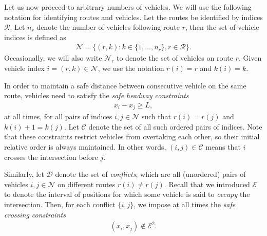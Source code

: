 \documentclass[a4paper]{report}
\theoremstyle{definition}
\theoremstyle{plain}
\begin{document}
Let us now proceed to arbitrary numbers of vehicles. We will use the following
notation for identifying routes and vehicles.
%
Let the routes be identified by indices $\mathcal{R}$. Let $n_{r}$ denote the
number of vehicles following route $r$, then the set of vehicle indices is
defined as
\begin{align}
  \mathcal{N} = \{ (r, k) : k \in \{1, \dots, n_{r}\}, r \in \mathcal{R}\} .
\end{align}
Occasionally, we will also write $\mathcal{N}_{r}$ to denote the set of vehicles
on route $r$. Given vehicle index $i = (r, k) \in \mathcal{N}$, we use the
notation $r(i) = r$ and $k(i) = k$.

In order to maintain a safe distance between consecutive vehicle on the same
route, vehicles need to satisfy the \textit{safe headway constraints}
\begin{align}
  \label{eq:follow_constraints}
  x_{i} - x_{j} \geq L ,
\end{align}
at all times, for all pairs of indices $i, j \in \mathcal{N}$ such that
$r(i) = r(j)$ and $k(i) + 1 = k(j)$. Let $\mathcal{C}$ denote the set of all
such ordered pairs of indices. Note that these constraints restrict vehicles
from overtaking each other, so their initial relative order is always
maintained. In other words, $(i,j) \in \mathcal{C}$ means that $i$ crosses the
intersection before $j$.

Similarly, let $\mathcal{D}$ denote the set of \emph{conflicts}, which are all
(unordered) pairs of vehicles $i, j \in \mathcal{N}$ on different routes
$r(i) \neq r(j)$.
%
Recall that we introduced $\mathcal{E}$ to denote the interval of positions for
which some vehicle is said to \emph{occupy} the intersection. Then, for each conflict
$\{i,j\}$, we impose at all times the \emph{safe crossing constraints}
\begin{align}
  \label{eq:2}
  (x_{i}, x_{j}) \notin \mathcal{E}^{2} .
\end{align}
\end{document}
